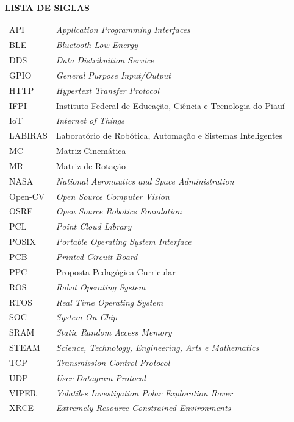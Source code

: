 \begin{center}
\textbf{LISTA DE SIGLAS}
\end{center}
\vspace*{0.5cm}
\begin{tabular}{ll}
API & \textit{Application Programming Interfaces} \\
BLE & \textit{Bluetooth Low Energy} \\
DDS & \textit{Data Distribuition Service} \\
GPIO & \textit{General Purpose Input/Output} \\
HTTP & \textit{Hypertext Transfer Protocol} \\
IFPI & Instituto Federal de Educação, Ciência e Tecnologia do Piauí \\
IoT & \textit{Internet of Things} \\
LABIRAS & Laboratório de Robótica, Automação e Sistemas Inteligentes \\
MC & Matriz Cinemática \\
MR & Matriz de Rotação \\
NASA & \textit{National Aeronautics and Space Administration} \\
Open-CV & \textit{Open Source Computer Vision} \\
OSRF & \textit{Open Source Robotics Foundation} \\
PCL & \textit{Point Cloud Library} \\
POSIX & \textit{Portable Operating System Interface} \\
PCB & \textit{Printed Circuit Board} \\
PPC & Proposta Pedagógica Curricular \\
ROS & \textit{Robot Operating System} \\
RTOS & \textit{Real Time Operating System} \\
SOC & \textit{System On Chip} \\
SRAM & \textit{Static Random Access Memory} \\
STEAM & \textit{Science, Technology, Engineering, Arts e Mathematics} \\
TCP & \textit{Transmission Control Protocol} \\
UDP & \textit{User Datagram Protocol} \\
VIPER & \textit{Volatiles Investigation Polar Exploration Rover} \\
XRCE & \textit{Extremely Resource Constrained Environments}



\end{tabular}
\addtocounter{table}{0}